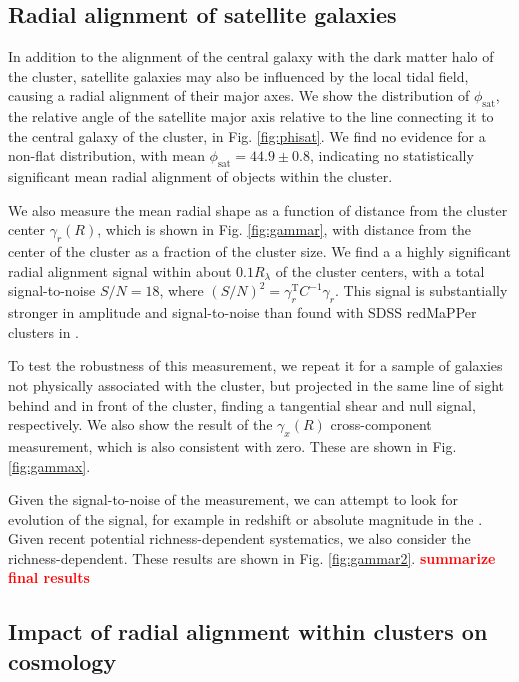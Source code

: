 \documentclass[fleqn,usenatbib]{mnras}
\newcommand{\verify}[1]{\textcolor{red}{\textbf{{#1}}}}
\begin{document}
\subsection{Radial alignment of satellite galaxies}\label{radial}

In addition to the alignment of the central galaxy with the dark matter halo of the cluster, satellite galaxies may also be influenced by the local tidal field, causing a radial alignment of their major axes. We show the distribution of $\phi_{\mathrm{sat}}$, the relative angle of the satellite major axis relative to the line connecting it to the central galaxy of the cluster, in Fig. \ref{fig:phisat}. We find no evidence for a non-flat distribution, with mean $\phi_{\mathrm{sat}}=44.9\pm 0.8$\textdegree, indicating no statistically significant mean radial alignment of objects within the cluster.

We also measure the mean radial shape as a function of distance from the cluster center $\gamma_r(R)$, which is shown in Fig. \ref{fig:gammar}, with distance from the center of the cluster as a fraction of the cluster size. We find a a highly significant radial alignment signal within about $0.1 R_{\lambda}$ of the cluster centers, with a total signal-to-noise $S/N=18$, where $(S/N)^2=\gamma_r^{\mathrm{T}} C^{-1} \gamma_r$. This signal is substantially stronger in amplitude and signal-to-noise than found with SDSS redMaPPer clusters in \cite{Huang_2016}.

To test the robustness of this measurement, we repeat it for a sample of galaxies not physically associated with the cluster, but projected in the same line of sight behind and in front of the cluster, finding a tangential shear and null signal, respectively. We also show the result of the $\gamma_x(R)$ cross-component measurement, which is also consistent with zero. These are shown in Fig. \ref{fig:gammax}.

Given the signal-to-noise of the measurement, we can attempt to look for evolution of the signal, for example in redshift or absolute magnitude in the . Given recent potential richness-dependent systematics, we also consider the richness-dependent. These results are shown in Fig. \ref{fig:gammar2}. \verify{summarize final results}

\subsection{Impact of radial alignment within clusters on cosmology}
\end{document}
